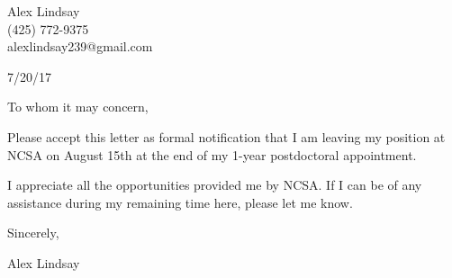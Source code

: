 \documentclass[11pt]{article}
\begin{document}
Alex Lindsay\\
(425) 772-9375\\
alexlindsay239@gmail.com

7/20/17

To whom it may concern,

Please accept this letter as formal notification that I am leaving my position
at NCSA on August 15th at the end of my 1-year postdoctoral appointment.

I appreciate all the opportunities provided me by NCSA. If I can be of any
assistance during my remaining time here, please let me know.

Sincerely,

Alex Lindsay
\end{document}

